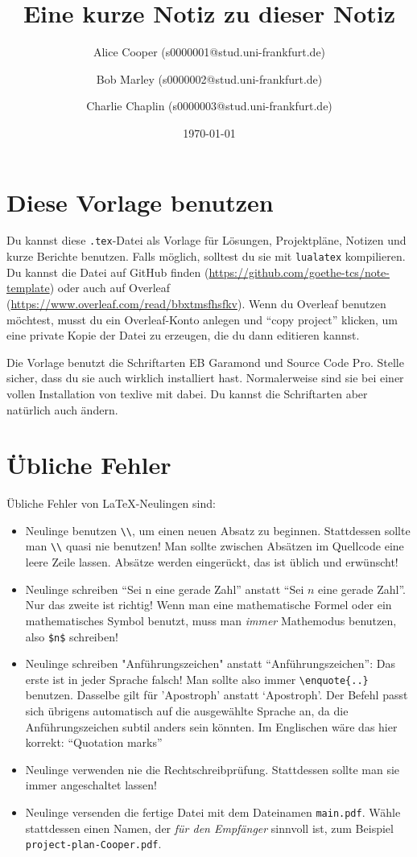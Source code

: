 \documentclass[a4paper,11pt,oneside]{scrartcl}
\title{Eine kurze Notiz zu dieser Notiz}
\author{%
  Alice Cooper (s0000001@stud.uni-frankfurt.de)%
  \and Bob Marley (s0000002@stud.uni-frankfurt.de)%
  \and Charlie Chaplin (s0000003@stud.uni-frankfurt.de)%
}
\date{\today}
\begin{document}
\maketitle

\section*{Diese Vorlage benutzen}

Du kannst diese \texttt{.tex}-Datei als Vorlage für Lösungen, Projektpläne, Notizen und kurze Berichte benutzen.
Falls möglich, solltest du sie mit \verb|lualatex| kompilieren.
Du kannst die Datei auf GitHub finden (\url{https://github.com/goethe-tcs/note-template}) oder auch auf Overleaf (\url{https://www.overleaf.com/read/bbxtmsfhsfkv}). Wenn du Overleaf benutzen möchtest, musst du ein Overleaf-Konto anlegen und \hyphenquote{english}{copy project} klicken, um eine private Kopie der Datei zu erzeugen, die du dann editieren kannst.

Die Vorlage benutzt die Schriftarten EB Garamond und Source Code Pro. Stelle sicher, dass du sie auch wirklich installiert hast. Normalerweise sind sie bei einer vollen Installation von texlive mit dabei. Du kannst die Schriftarten aber natürlich auch ändern.

\section*{Übliche Fehler}

Übliche Fehler von \LaTeX{}-Neulingen sind:
\begin{itemize}
  \item Neulinge benutzen \verb|\\|, um einen neuen Absatz zu beginnen. Stattdessen sollte man \verb|\\| quasi nie benutzen!
  Man sollte zwischen Absätzen im Quellcode eine leere Zeile lassen. Absätze werden eingerückt, das ist üblich und erwünscht!
  \item Neulinge schreiben \enquote{Sei n eine gerade Zahl} anstatt \enquote{Sei $n$ eine gerade Zahl}. Nur das zweite ist richtig! Wenn man eine mathematische Formel oder ein mathematisches Symbol benutzt, muss man \emph{immer} Mathemodus benutzen, also \verb|$n$| schreiben!
  \item Neulinge schreiben "Anführungszeichen" anstatt \enquote{Anführungszeichen}: Das erste ist in jeder Sprache falsch! Man sollte also immer \verb|\enquote{..}| benutzen.
  Dasselbe gilt für 'Apostroph' anstatt \enquote*{Apostroph}.
  Der Befehl passt sich übrigens automatisch auf die ausgewählte Sprache an, da die Anführungszeichen subtil anders sein könnten.
  Im Englischen wäre das hier korrekt:
  \enquote{Quotation marks}
  \item Neulinge verwenden nie die Rechtschreibprüfung. Stattdessen sollte man sie immer angeschaltet lassen!
  \item Neulinge versenden die fertige Datei mit dem Dateinamen \verb|main.pdf|. Wähle stattdessen einen Namen, der \emph{für den Empfänger} sinnvoll ist, zum Beispiel \verb|project-plan-Cooper.pdf|.
\end{itemize}
\end{document}
